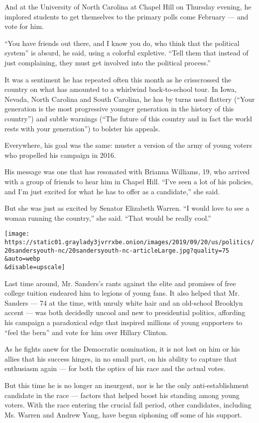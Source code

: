 And at the University of North Carolina at Chapel Hill on Thursday
evening, he implored students to get themselves to the primary polls
come February --- and vote for him.

``You have friends out there, and I know you do, who think that the
political system'' is absurd, he said, using a colorful expletive.
``Tell them that instead of just complaining, they must get involved
into the political process.''

It was a sentiment he has repeated often this month as he crisscrossed
the country on what has amounted to a whirlwind back-to-school tour. In
Iowa, Nevada, North Carolina and South Carolina, he has by turns used
flattery (``Your generation is the most progressive younger generation
in the history of this country'') and subtle warnings (``The future of
this country and in fact the world rests with your generation'') to
bolster his appeals.

Everywhere, his goal was the same: muster a version of the army of young
voters who propelled his campaign in 2016.

His message was one that has resonated with Brianna Williams, 19, who
arrived with a group of friends to hear him in Chapel Hill. ``I've seen
a lot of his policies, and I'm just excited for what he has to offer as
a candidate,'' she said.

But she was just as excited by Senator Elizabeth Warren. ``I would love
to see a woman running the country,'' she said. ``That would be really
cool.''

\texttt{[image: https://static01.graylady3jvrrxbe.onion/images/2019/09/20/us/politics/20sandersyouth-nc/20sandersyouth-nc-articleLarge.jpg?quality=75\\\&auto=webp\\\&disable=upscale]}

Last time around, Mr. Sanders's rants against the elite and promises of
free college tuition endeared him to legions of young fans. It also
helped that Mr. Sanders --- 74 at the time, with unruly white hair and
an old-school Brooklyn accent --- was both decidedly uncool and new to
presidential politics, affording his campaign a paradoxical edge that
inspired millions of young supporters to ``feel the bern'' and vote for
him over Hillary Clinton.

As he fights anew for the Democratic nomination, it is not lost on him
or his allies that his success hinges, in no small part, on his ability
to capture that enthusiasm again --- for both the optics of his race and
the actual votes.

But this time he is no longer an insurgent, nor is he the only
anti-establishment candidate in the race --- factors that helped boost
his standing among young voters. With the race entering the crucial fall
period, other candidates, including Ms. Warren and Andrew Yang, have
begun siphoning off some of his support.

